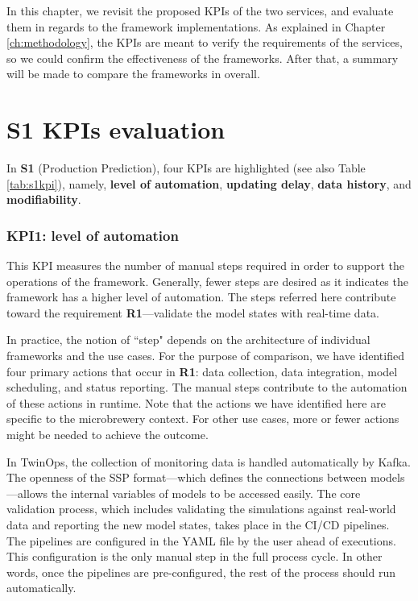 In this chapter, we revisit the proposed KPIs of the two services, and evaluate them in regards to the framework implementations. As explained in Chapter \ref{ch:methodology}, the KPIs are meant to verify the requirements of the services, so we could confirm the effectiveness of the frameworks. After that, a summary will be made to compare the frameworks in overall.

\section{S1 KPIs evaluation}
In \textbf{S1} (Production Prediction), four KPIs are highlighted (see also Table \ref{tab:s1kpi}), namely, \textbf{level of automation}, \textbf{updating delay}, \textbf{data history}, and \textbf{modifiability}. 

\subsubsection{KPI1: level of automation}
This KPI measures the number of manual steps required in order to support the operations of the framework. Generally, fewer steps are desired as it indicates the framework has a higher level of automation. The steps referred here contribute toward the requirement \textbf{R1}---validate the model states with real-time data.

In practice, the notion of ``step" depends on the architecture of individual frameworks and the use cases. For the purpose of comparison, we have identified four primary actions that occur in \textbf{R1}: data collection, data integration, model scheduling, and status reporting. The manual steps contribute to the automation of these actions in runtime. Note that the actions we have identified here are specific to the microbrewery context. For other use cases, more or fewer actions might be needed to achieve the outcome.

In TwinOps, the collection of monitoring data is handled automatically by Kafka. The openness of the SSP format---which defines the connections between models---allows the internal variables of models to be accessed easily. The core validation process, which includes validating the simulations against real-world data and reporting the new model states, takes place in the CI/CD pipelines. The pipelines are configured in the YAML file by the user ahead of executions. This configuration is the only manual step in the full process cycle. In other words, once the pipelines are pre-configured, the rest of the process should run automatically.

